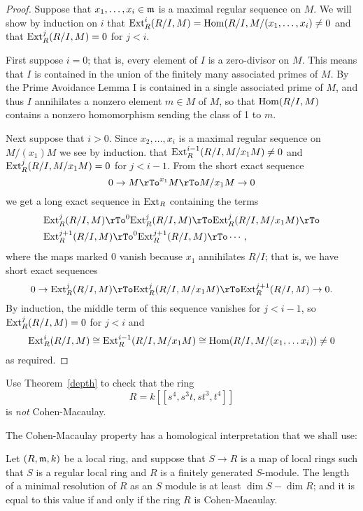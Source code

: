  
\begin{proof} Suppose that $x_{1}, \dots, x_{i}\in \gm$ is a maximal regular sequence
on $M$. We will show by induction on $i$ that $\Ext^{i}_{R}(R/I, M) = \Hom(R/I,  M/(x_{1}, \dots, x_{i}) \neq 0$ and
that $\Ext^{j}_{R}(R/I,M) = 0$ for $j<i$.

First suppose $i=0$; that is, every element of $I$ is
a zero-divisor on $M$. This means that $I$ is contained in the union of the finitely
many associated primes of $M$. By the Prime Avoidance Lemma \cite[****]{E} I is contained in a single associated prime of $M$, and thus $I$ annihilates a nonzero  element $m\in M$
of $M$, so that $\Hom(R/I,M)$ contains a nonzero homomorphism sending the class of 1 to $m$.

Next suppose that $i>0$. Since $x_{2}, \dots, x_{i}$ is a maximal regular sequence on $M/(x_{1})M$ we see by induction. that $\Ext_R^{i-1}(R/I, M/x_{1}M) \neq 0$ and $\Ext^{j}_{R}(R/I,M/x_{1}M) = 0$ for $j<i-1$. From the short exact sequence
$$
0\to M\rTo^{x_{1}}M \rTo M/x_{1}M \to 0
$$
we get a long exact sequence in $\Ext_R$ containing the terms
\begin{align*}
 &\Ext_R^{j}(R/I,M) \rTo^{0} \Ext_R^{j}(R/I,M) \rTo \Ext_R^{j}(R/I,M/x_{1}M) \rTo\\ 
 &\Ext_R^{j+1}(R/I,M)\rTo^{0} \Ext_R^{j+1}(R/I,M) \rTo \cdots,
\end{align*}
where the maps marked 0 vanish because $x_{1}$ annihilates $R/I$; that is, we have 
short exact sequences
 $$
0\to \Ext_R^{j}(R/I,M) \rTo\Ext_R^{j}(R/I,M/x_{1}M) \rTo \Ext_R^{j+1}(R/I,M)\to 0.
 $$
By induction, the middle term of this sequence vanishes for $j<i-1$, so 
$\Ext_R^{j}(R/I,M) = 0$ for $j<i$ and 
$$
\Ext_R^{i}(R/I,M) \cong \Ext_R^{i-1}(R/I,M/x_{1}M) \cong \Hom(R/I, M/(x_{1}, \dots x_{i}))\neq 0
$$
as required.
\end{proof}

\begin{exercise}
 Use Theorem~\ref{depth} to check that the ring
 $$
 R = k[[s^{4}, s^{3}t, st^{3}, t^{4}]]
 $$
is \emph{not} Cohen-Macaulay.
\end{exercise}

The Cohen-Macaulay property has a homological interpretation that we shall use:

\begin{theorem} \label{lower bound for pd}
 Let $(R,\gm,k)$ be a local ring, and suppose that $S\to R$ is a map of local  rings such that $S$ is a regular local ring and $R$ is a finitely generated $S$-module. The length of a minimal resolution of $R$ as an $S$ module
 is at least $\dim S - \dim R$; and it is equal to this value if and only if the 
 ring $R$ is Cohen-Macaulay.
 \end{theorem}
  
